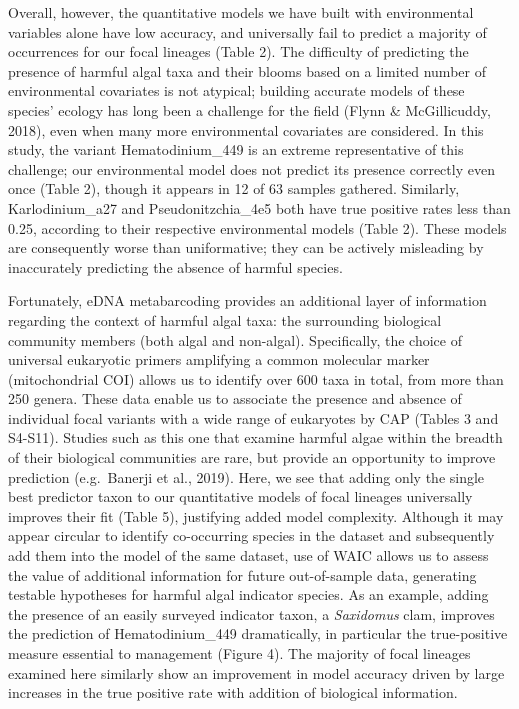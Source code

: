 \documentclass[
]{article}
\begin{document}
Overall, however, the quantitative models we have built with
environmental variables alone have low accuracy, and universally fail to
predict a majority of occurrences for our focal lineages (Table 2). The
difficulty of predicting the presence of harmful algal taxa and their
blooms based on a limited number of environmental covariates is not
atypical; building accurate models of these species' ecology has long
been a challenge for the field (Flynn \& McGillicuddy, 2018), even when
many more environmental covariates are considered. In this study, the
variant Hematodinium\_449 is an extreme representative of this
challenge; our environmental model does not predict its presence
correctly even once (Table 2), though it appears in 12 of 63 samples
gathered. Similarly, Karlodinium\_a27 and Pseudonitzchia\_4e5 both have
true positive rates less than 0.25, according to their respective
environmental models (Table 2). These models are consequently worse than
uniformative; they can be actively misleading by inaccurately predicting
the absence of harmful species.

Fortunately, eDNA metabarcoding provides an additional layer of
information regarding the context of harmful algal taxa: the surrounding
biological community members (both algal and non-algal). Specifically,
the choice of universal eukaryotic primers amplifying a common molecular
marker (mitochondrial COI) allows us to identify over 600 taxa in total,
from more than 250 genera. These data enable us to associate the
presence and absence of individual focal variants with a wide range of
eukaryotes by CAP (Tables 3 and S4-S11). Studies such as this one that
examine harmful algae within the breadth of their biological communities
are rare, but provide an opportunity to improve prediction (e.g.~Banerji
et al., 2019). Here, we see that adding only the single best predictor
taxon to our quantitative models of focal lineages universally improves
their fit (Table 5), justifying added model complexity. Although it may
appear circular to identify co-occurring species in the dataset and
subsequently add them into the model of the same dataset, use of WAIC
allows us to assess the value of additional information for future
out-of-sample data, generating testable hypotheses for harmful algal
indicator species. As an example, adding the presence of an easily
surveyed indicator taxon, a \emph{Saxidomus} clam, improves the
prediction of Hematodinium\_449 dramatically, in particular the
true-positive measure essential to management (Figure 4). The majority
of focal lineages examined here similarly show an improvement in model
accuracy driven by large increases in the true positive rate with
addition of biological information.
\end{document}
